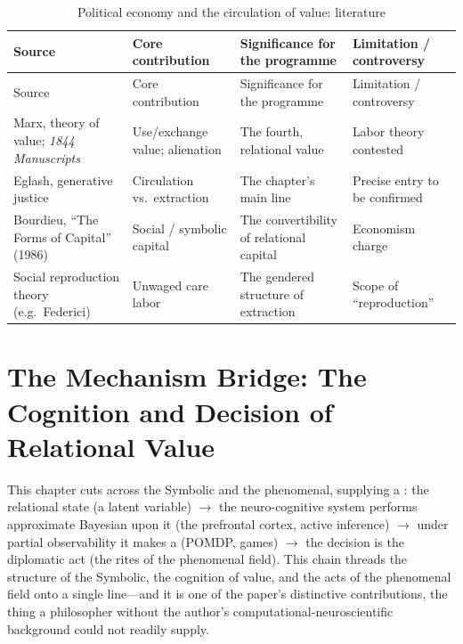 \goldrule
\footnotesize
\begin{longtable}{Y Y Y Y}
\caption{Political economy and the circulation of value: literature}\label{p07:tab:polecon}\\
\toprule
{}
Source & Core contribution & Significance for the programme & Limitation / controversy \\
\midrule
\endfirsthead
{}
Source & Core contribution & Significance for the programme & Limitation / controversy \\
\midrule
\endhead
Marx, theory of value; \emph{1844 Manuscripts} & Use/exchange value; alienation & The fourth, relational value & Labor theory contested \\
Eglash, generative justice & Circulation vs.\ extraction & The chapter's main line & Precise entry to be confirmed \\
Bourdieu, ``The Forms of Capital'' (1986) & Social / symbolic capital & The convertibility of relational capital & Economism charge \\
Social reproduction theory (e.g.\ Federici) & Unwaged care labor & The gendered structure of extraction & Scope of ``reproduction'' \\
\bottomrule
\end{longtable}

\section{The Mechanism Bridge: The Cognition and Decision of Relational Value}\label{p07:sec:bridge}

This chapter cuts across the Symbolic and the phenomenal, supplying a : the relational state (a latent variable) $\rightarrow$ the neuro-cognitive system performs approximate Bayesian  upon it (the prefrontal cortex, active inference) $\rightarrow$ under partial observability it makes a  (POMDP, games) $\rightarrow$ the decision is the diplomatic act (the rites of the phenomenal field). This chain threads the structure of the Symbolic, the cognition of value, and the acts of the phenomenal field onto a single line---and it is one of the paper's distinctive contributions, the thing a philosopher without the author's computational-neuroscientific background could not readily supply.

